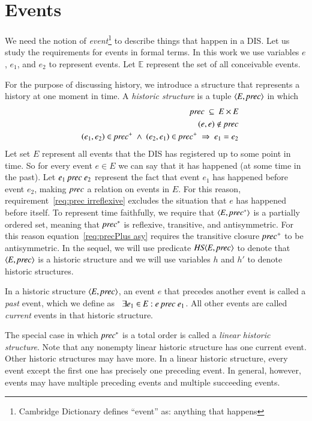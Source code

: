 \documentclass{elsarticle}
\def\id#1{\text{\em #1\/}}
\def\Events{{\mathit E}}
\begin{document}
\section{Events}
\label{sct:Events}
	We need the notion of {\em event}\footnote{Cambridge Dictionary defines ``event'' as: anything that happens} to describe things that happen in a DIS.
	Let us study the requirements for events in formal terms.
	In this work we use variables $e$, $e_1$, and $e_2$ to represent events.
	Let $\mathbb E$ represent the set of all conceivable events.

	For the purpose of discussing history, we introduce a structure that represents a history at one moment in time.
	A {\em historic structure} is a tuple $\la \Events, \id{prec}\ra$ in which
\begin{eqnarray}
	&&\id{prec}\ \subseteq\ \Events\times\Events\label{req:precInE}\\
	&&(e,e)\notin\id{prec}\label{req:prec irreflexive}\\
	&&(e_1,e_2)\in\id{prec}^+\ \wedge\ (e_2,e_1)\in\id{prec}^+\ \Rightarrow\ e_1=e_2\label{req:precPlus asy}
\end{eqnarray}
	Let set $\Events$ represent all events that the DIS has registered up to some point in time.
	So for every event $e\in\Events$ we can say that it has happened (at some time in the past).
	Let $e_1\ \id{prec}\ e_2$ represent the fact that event $e_1$ has happened before event $e_2$,
	making $\id{prec}$ a relation on events in $\Events$.
	For this reason, requirement~\ref{req:prec irreflexive} excludes the situation that $e$ has happened before itself.
	To represent time faithfully, we require that $\la\Events,\id{prec}^*\ra$ is a partially ordered set,
	meaning that $\id{prec}^*$ is reflexive, transitive, and antisymmetric.
	For this reason equation~\ref{req:precPlus asy} requires the transitive closure $\id{prec}^+$ to be antisymmetric.
	In the sequel, we will use predicate $\id{HS}\la \Events, \id{prec}\ra$
	to denote that $\la \Events, \id{prec}\ra$ is a historic structure
	and we will use variables $h$ and $h'$ to denote historic structures.

	In a historic structure $\la \Events, \id{prec}\ra$, an event $e$ that precedes another event is called a {\em past} event,
	which we define as \ $\exists e_1\in\Events: e\ \id{prec}\ e_1$.
	All other events are called {\em current} events in that historic structure.

	The special case in which $\id{prec}^*$ is a total order is called a {\em linear historic structure}.
	Note that any nonempty linear historic structure has one current event.
	Other historic structures may have more.
	In a linear historic structure, every event except the first one has precisely one preceding event.
	In general, however, events may have multiple preceding events and multiple succeeding events.
\end{document}
